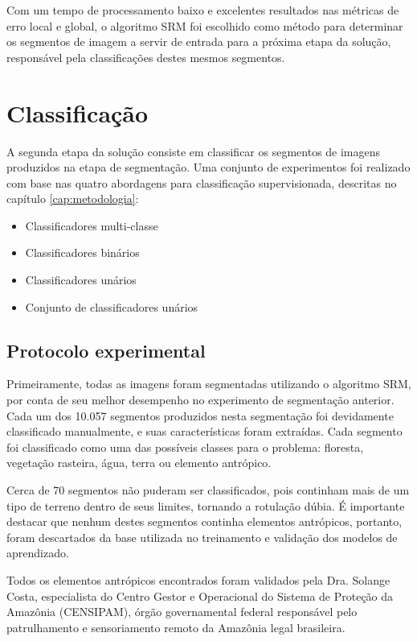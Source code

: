 Com um tempo de processamento baixo e excelentes resultados nas métricas de erro local e global, o algoritmo SRM foi escolhido como método para determinar os segmentos de imagem a servir de entrada para a próxima etapa da solução, responsável pela classificações destes mesmos segmentos.

\section{Classificação}\label{sec:expClassificacao}

A segunda etapa da solução consiste em classificar os segmentos de imagens produzidos na etapa de segmentação. Uma conjunto de experimentos foi realizado com base nas quatro abordagens para classificação supervisionada, descritas no capítulo \ref{cap:metodologia}:

\begin{itemize}
	\item Classificadores multi-classe
	\item Classificadores binários
	\item Classificadores unários
	\item Conjunto de classificadores unários
\end{itemize}

\subsection{Protocolo experimental}

Primeiramente, todas as imagens foram segmentadas utilizando o algoritmo SRM, por conta de seu melhor desempenho no experimento de segmentação anterior. Cada um dos 10.057 segmentos produzidos nesta segmentação foi devidamente classificado manualmente, e suas características foram extraídas. Cada segmento foi classificado como uma das possíveis classes para o problema: floresta, vegetação rasteira, água, terra ou elemento antrópico.

Cerca de 70 segmentos não puderam ser classificados, pois continham mais de um tipo de terreno dentro de seus limites, tornando a rotulação dúbia. É importante destacar que nenhum destes segmentos continha elementos antrópicos, portanto, foram descartados da base utilizada no treinamento e validação dos modelos de aprendizado.

Todos os elementos antrópicos encontrados foram validados pela Dra. Solange Costa, especialista do Centro Gestor e Operacional do Sistema de Proteção da Amazônia (CENSIPAM), órgão governamental federal responsável pelo patrulhamento e sensoriamento remoto da Amazônia legal brasileira.

